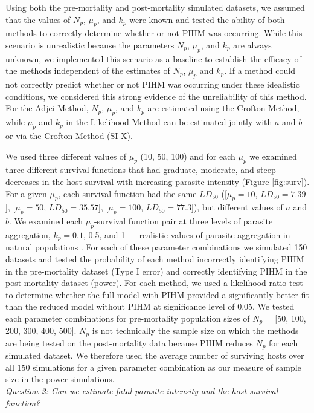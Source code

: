 \documentclass[12pt, a4paper]{article}
\begin{document}
Using both the pre-mortality and post-mortality simulated datasets,  we assumed
that the values of $N_p$, $\mu_p$, and $k_p$ were known and tested the ability
of both methods to correctly determine whether or not PIHM was occurring.
While this scenario is unrealistic because the parameters $N_p$, $\mu_p$, and
$k_p$ are always unknown, we implemented this scenario as a baseline to
establish the efficacy of the methods independent of the estimates of $N_p$,
$\mu_p$ and $k_p$.  If a method could not correctly predict whether or not PIHM
was occurring under these idealistic conditions, we considered this strong
evidence of the unreliability of this method.  For the Adjei Method, $N_p$,
$\mu_p$, and $k_p$ are estimated using the Crofton Method, while $\mu_p$ and
$k_p$ in the Likelihood Method can be estimated jointly with $a$ and $b$ or via
the Crofton Method (SI X).

We used three different values of $\mu_p$ (10, 50, 100) and for each $\mu_p$ we examined three different survival functions that had graduate, moderate, and steep decreases in the host survival with increasing parasite intensity (Figure \ref{fig:surv}).  For a given $\mu_p$, each survival function had the same $LD_{50}$ ([$\mu_p = 10$, $LD_{50} = 7.39$], [$\mu_p = 50$, $LD_{50} = 35.57$], [$\mu_p = 100$, $LD_{50}= 77.3$]),  but different values of $a$ and $b$.  We examined each $\mu_p$-survival function pair at  three levels of parasite
aggregation, $k_p = 0.1$, 0.5, and 1 --- realistic values of parasite aggregation in natural populations \citep{Shaw1998}.  For each of these parameter
combinations we simulated 150 datasets and tested the probability of each method incorrectly identifying PIHM in the pre-mortality dataset (Type I error) and correctly identifying PIHM in the post-mortality dataset (power).  For each method, we used a likelihood ratio test to determine whether the full model with PIHM provided a significantly better fit than the reduced model without PIHM at significance level of 0.05.  We tested each parameter combinations for pre-mortality population sizes of $N_p$ = [50, 100, 200, 300, 400, 500]. $N_p$ is not technically the sample size on which the methods are being
tested on the post-mortality data because PIHM reduces $N_p$ for each simulated
dataset.  We therefore used the average number of surviving hosts over all 150 simulations for a given parameter combination as our measure of sample size in the power simulations.\\

\noindent
\emph{Question 2: Can we estimate fatal parasite intensity and the host survival function?}
\end{document}
